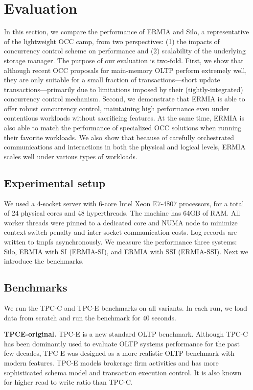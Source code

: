 
\section{Evaluation}
In this section, we compare the performance of ERMIA and Silo, a representative of the lightweight OCC camp, from two perspectives: (1) the impacts of concurrency control scheme on performance and (2) scalability of the underlying storage manager. The purpose of our evaluation is two-fold. First, we show that although recent OCC proposals for main-memory OLTP perform extremely well, they are only suitable for a small fraction of transactions---short update transactions---primarily due to limitations imposed by their (tightly-integrated) concurrency control mechanism. Second, we demonstrate that ERMIA is able to offer robust concurrency control, maintaining high performance even under contentious workloads without sacrificing features. At the same time, ERMIA is also able to match the performance of specialized OCC solutions when running their favorite workloads. We also show that because of carefully orchestrated communications and interactions in both the physical and logical levels, ERMIA scales well under various types of workloads.

\subsection{Experimental setup}
We used a 4-socket server with 6-core Intel Xeon E7-4807 processors, for a total of 24 physical cores and 48 hyperthreads. The machine has 64GB of RAM. All worker threads were pinned to a dedicated core and NUMA node to minimize context switch penalty and inter-socket communication costs. Log records are written to tmpfs asynchronously. We measure the performance three systems: Silo, ERMIA with SI (ERMIA-SI), and ERMIA with SSI (ERMIA-SSI). Next we introduce the benchmarks.

\subsection{Benchmarks}
We run the TPC-C and TPC-E benchmarks on all variants. In each run, we load data from scratch and run the benchmark for 40 seconds.


\textbf{TPCE-original.}
TPC-E is a new standard OLTP benchmark. Although TPC-C has been dominantly used to evaluate OLTP systems performance for the past few decades, TPC-E was designed as a more realistic OLTP benchmark with modern features.  TPC-E models brokerage firm activities and has more sophisticated schema model and transaction execution control. It is also known for higher read to write ratio than TPC-C.


